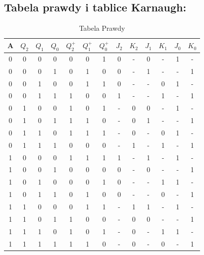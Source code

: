 \documentclass[12pt,a4paper]{article}
\begin{document}
		\subsection{Tabela prawdy i tablice Karnaugh:}
			\begin{table}[H]
				\caption{Tabela Prawdy}
				\vspace{0.2cm}
				\centering
				\begin{tabular}{cccc|ccc|cc|cc|cc}
					A	&\(Q_2\)&\(Q_1\)&\(Q_0\)&\(Q_2^+\)&\(Q_1^+\)&\(Q_0^+\)&\(J_2\)&\(K_2\)&\(J_1\)&\(K_1\)&\(J_0\)&\(K_0\)\\\hline
					0	&	0	&	0	&	0	&	0	&	0	&	1	&	0	&	-	&	0	&	-	&	1	&	-	\\
					0	&	0	&	0	&	1	&	0	&	1	&	0	&	0	&	-	&	1	&	-	&	-	&	1	\\
					0	&	0	&	1	&	0	&	0	&	1	&	1	&	0	&	-	&	-	&	0	&	1	&	-	\\
					0	&	0	&	1	&	1	&	1	&	0	&	0	&	1	&	-	&	-	&	1	&	-	&	1	\\\hline
					0	&	1	&	0	&	0	&	1	&	0	&	1	&	-	&	0	&	0	&	-	&	1	&	-	\\
					0	&	1	&	0	&	1	&	1	&	1	&	0	&	-	&	0	&	1	&	-	&	-	&	1	\\
					0	&	1	&	1	&	0	&	1	&	1	&	1	&	-	&	0	&	-	&	0	&	1	&	-	\\
					0	&	1	&	1	&	1	&	0	&	0	&	0	&	-	&	1	&	-	&	1	&	-	&	1	\\\hline
					1	&	0	&	0	&	0	&	1	&	1	&	1	&	1	&	-	&	1	&	-	&	1	&	-	\\
					1	&	0	&	0	&	1	&	0	&	0	&	0	&	0	&	-	&	0	&	-	&	-	&	1	\\
					1	&	0	&	1	&	0	&	0	&	0	&	1	&	0	&	-	&	-	&	1	&	1	&	-	\\
					1	&	0	&	1	&	1	&	0	&	1	&	0	&	0	&	-	&	-	&	0	&	-	&	1	\\\hline
					1	&	1	&	0	&	0	&	0	&	1	&	1	&	-	&	1	&	1	&	-	&	1	&	-	\\
					1	&	1	&	0	&	1	&	1	&	0	&	0	&	-	&	0	&	0	&	-	&	-	&	1	\\
					1	&	1	&	1	&	0	&	1	&	0	&	1	&	-	&	0	&	-	&	1	&	1	&	-	\\
					1	&	1	&	1	&	1	&	1	&	1	&	0	&	-	&	0	&	-	&	0	&	-	&	1	\\
					\end{tabular}
			\end{table}
\end{document}
